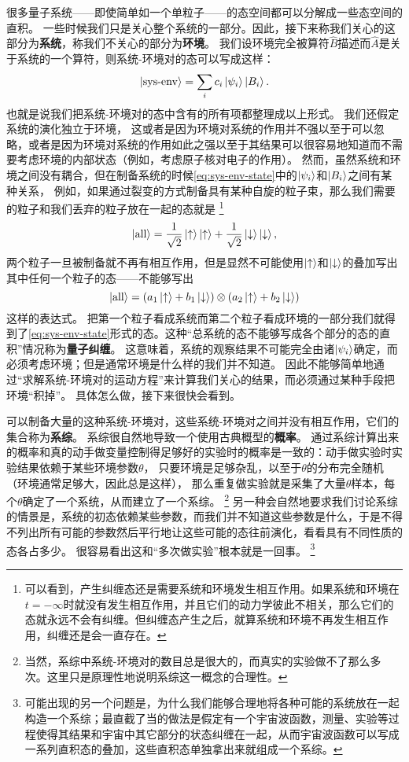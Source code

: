 \documentclass[hyperref, UTF8, a4paper]{ctexart}
\begin{document}
很多量子系统——即使简单如一个单粒子——的态空间都可以分解成一些态空间的直积。
一些时候我们只是关心整个系统的一部分。因此，接下来称我们关心的这部分为\textbf{系统}，称我们不关心的部分为\textbf{环境}。
我们设环境完全被算符$\hat{B}$描述而$\hat{A}$是关于系统的一个算符，则系统-环境对的态可以写成这样：
\begin{equation}
    \ket{\text{sys-env}} = \sum_i c_i \ket{\psi_i} \ket{B_i}.
    \label{eq:sys-env-state}
\end{equation}
也就是说我们把系统-环境对的态中含有的所有项都整理成以上形式。
我们还假定系统的演化独立于环境，
这或者是因为环境对系统的作用并不强以至于可以忽略，或者是因为环境对系统的作用如此之强以至于其结果可以很容易地知道而不需要考虑环境的内部状态（例如，考虑原子核对电子的作用）。
然而，虽然系统和环境之间没有耦合，但在制备系统的时候\eqref{eq:sys-env-state}中的$\ket{\psi_i}$和$\ket{B_i}$之间有某种关系，
例如，如果通过裂变的方式制备具有某种自旋的粒子束，那么我们需要的粒子和我们丢弃的粒子放在一起的态就是%
\footnote{可以看到，产生纠缠态还是需要系统和环境发生相互作用。如果系统和环境在$t=-\infty$时就没有发生相互作用，并且它们的动力学彼此不相关，那么它们的态就永远不会有纠缠。但纠缠态产生之后，就算系统和环境不再发生相互作用，纠缠还是会一直存在。\label{note:entangled-states}}
\[
    \ket{\text{all}} = \frac{1}{\sqrt{2}} \ket{\uparrow} \ket{\uparrow} + \frac{1}{\sqrt{2}} \ket{\downarrow} \ket{\downarrow},
\]
两个粒子一旦被制备就不再有相互作用，但是显然不可能使用$\ket{\uparrow}$和$\ket{\downarrow}$的叠加写出其中任何一个粒子的态——不能够写出
\[
    \ket{\text{all}} = \left( a_1 \ket{\uparrow} + b_1 \ket{\downarrow} \right) \otimes \left( a_2 \ket{\uparrow} + b_2 \ket{\downarrow} \right)
\]
这样的表达式。
把第一个粒子看成系统而第二个粒子看成环境的一部分我们就得到了\eqref{eq:sys-env-state}形式的态。这种“总系统的态不能够写成各个部分的态的直积”情况称为\textbf{量子纠缠}。
这意味着，系统的观察结果不可能完全由诸$\ket{\psi_i}$确定，而必须考虑环境；但是通常环境是什么样的我们并不知道。
因此不能够简单地通过“求解系统-环境对的运动方程”来计算我们关心的结果，而必须通过某种手段把环境“积掉”。
具体怎么做，接下来很快会看到。

可以制备大量的这种系统-环境对，这些系统-环境对之间并没有相互作用，它们的集合称为\textbf{系综}。
系综很自然地导致一个使用古典概型的\textbf{概率}。
通过系综计算出来的概率和真的动手做变量控制得足够好的实验时的概率是一致的：动手做实验时实验结果依赖于某些环境参数$\theta$，
只要环境是足够杂乱，以至于$\theta$的分布完全随机（环境通常足够大，因此总是这样），
那么重复做实验就是采集了大量$\theta$样本，每个$\theta$确定了一个系统，从而建立了一个系综。%
\footnote{当然，系综中系统-环境对的数目总是很大的，而真实的实验做不了那么多次。这里只是原理性地说明系综这一概念的合理性。}%
另一种会自然地要求我们讨论系综的情景是，系统的初态依赖某些参数，而我们并不知道这些参数是什么，于是不得不列出所有可能的参数然后平行地让这些可能的态往前演化，看看具有不同性质的态各占多少。
很容易看出这和“多次做实验”根本就是一回事。%
\footnote{可能出现的另一个问题是，为什么我们能够合理地将各种可能的系统放在一起构造一个系综；最直截了当的做法是假定有一个宇宙波函数，测量、实验等过程使得其结果和宇宙中其它部分的状态纠缠在一起，从而宇宙波函数可以写成一系列直积态的叠加，这些直积态单独拿出来就组成一个系综。}
\end{document}

